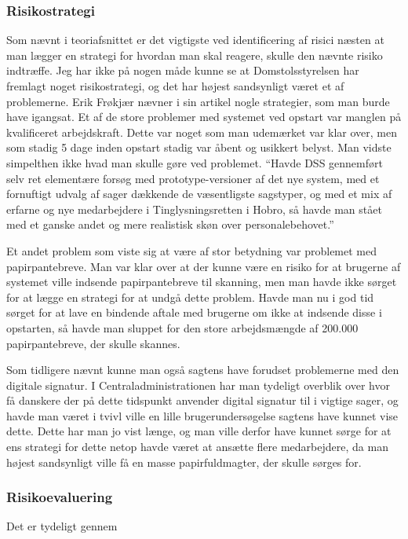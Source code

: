 \documentclass[10pt,a4paper,danish]{article}
\begin{document}
\subsubsection{Risikostrategi}
Som nævnt i teoriafsnittet er det vigtigste ved identificering af risici næsten at man lægger en strategi for hvordan man skal reagere, skulle den nævnte risiko indtræffe. Jeg har ikke på nogen måde kunne se at Domstolsstyrelsen har fremlagt noget risikostrategi, og det har højest sandsynligt været et af problemerne. Erik Frøkjær nævner i sin artikel \cite{Erik} nogle strategier, som man burde have igangsat. Et af de store problemer med systemet ved opstart var manglen på kvalificeret arbejdskraft. Dette var noget som man udemærket var klar over, men som stadig 5 dage inden opstart stadig var åbent og usikkert belyst. Man vidste simpelthen ikke hvad man skulle gøre ved problemet. "`Havde DSS gennemført selv ret elementære forsøg med prototype-versioner af det nye system, med et fornuftigt udvalg af sager dækkende de væsentligste sagstyper, og med et mix af erfarne og nye medarbejdere i Tinglysningsretten i Hobro, så havde man stået med et ganske andet og mere realistisk skøn over personalebehovet."' 

Et andet problem som viste sig at være af stor betydning var problemet med papirpantebreve. Man var klar over at der kunne være en risiko for at brugerne af systemet ville indsende papirpantebreve til skanning, men man havde ikke sørget for at lægge en strategi for at undgå dette problem. Havde man nu i god tid sørget for at lave en bindende aftale med brugerne om ikke at indsende disse i opstarten, så havde man sluppet for den store arbejdsmængde af 200.000 papirpantebreve, der skulle skannes. 

Som tidligere nævnt kunne man også sagtens have forudset problemerne med den digitale signatur. I Centraladministrationen har man tydeligt overblik over hvor få danskere der på dette tidspunkt anvender digital signatur til i vigtige sager, og havde man været i tvivl ville en lille brugerundersøgelse sagtens have kunnet vise dette. Dette har man jo vist længe, og man ville derfor have kunnet sørge for at ens strategi for dette netop havde været at ansætte flere medarbejdere, da man højest sandsynligt ville få en masse papirfuldmagter, der skulle sørges for.


\subsubsection{Risikoevaluering}
Det er tydeligt gennem 
\end{document}
